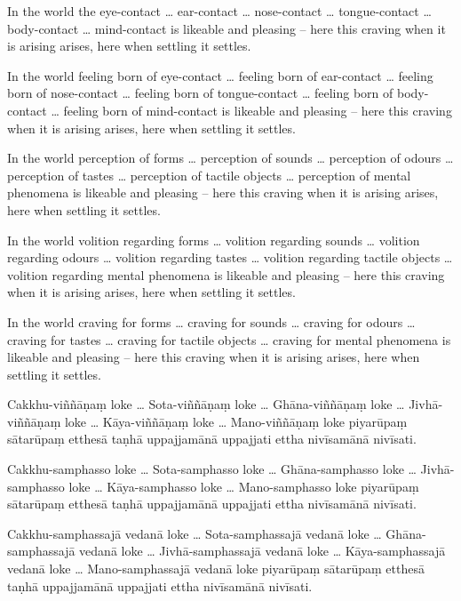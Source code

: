 In the world the eye-contact \ldots{} ear-contact \ldots{} nose-contact \ldots{}
tongue-contact \ldots{} body-contact \ldots{} mind-contact is likeable and
pleasing -- here this craving when it is arising arises, here when settling it
settles.

In the world feeling born of eye-contact \ldots{} feeling born of ear-contact
\ldots{} feeling born of nose-contact \ldots{} feeling born of tongue-contact
\ldots{} feeling born of body-contact \ldots{} feeling born of mind-contact is
likeable and pleasing -- here this craving when it is arising arises, here when
settling it settles.

In the world perception of forms \ldots{} perception of sounds \ldots{}
perception of odours \ldots{} perception of tastes \ldots{} perception of
tactile objects \ldots{} perception of mental phenomena is likeable and pleasing
-- here this craving when it is arising arises, here when settling it settles.

In the world volition regarding forms \ldots{} volition regarding sounds
\ldots{} volition regarding odours \ldots{} volition regarding tastes \ldots{}
volition regarding tactile objects \ldots{} volition regarding mental phenomena
is likeable and pleasing -- here this craving when it is arising arises, here
when settling it settles.

In the world craving for forms \ldots{} craving for sounds \ldots{} craving for
odours \ldots{} craving for tastes \ldots{} craving for tactile objects \ldots{}
craving for mental phenomena is likeable and pleasing -- here this craving when
it is arising arises, here when settling it settles.

\paliPage

Cakkhu-viññāṇaṃ loke \ldots{} Sota-viññāṇaṃ loke \ldots{} Ghāna-viññāṇaṃ loke
\ldots{} Jivhā-viññāṇaṃ loke \ldots{} Kāya-viññāṇaṃ loke \ldots{} Mano-viññāṇaṃ
loke piyarūpaṃ sātarūpaṃ etthesā taṇhā uppajjamānā uppajjati ettha nivīsamānā
nivīsati.

Cakkhu-samphasso loke \ldots{} Sota-samphasso loke \ldots{} Ghāna-samphasso loke
\ldots{} Jivhā-samphasso loke \ldots{} Kāya-samphasso loke \ldots{} Mano-samphasso
loke piyarūpaṃ sātarūpaṃ etthesā taṇhā uppajjamānā uppajjati ettha nivīsamānā
nivīsati.

Cakkhu-samphassajā vedanā loke \ldots{} Sota-samphassajā vedanā loke \ldots{}
Ghāna-samphassajā vedanā loke \ldots{} Jivhā-samphassajā vedanā loke \ldots{}
Kāya-samphassajā vedanā loke \ldots{} Mano-samphassajā vedanā loke piyarūpaṃ
sātarūpaṃ etthesā taṇhā uppajjamānā uppajjati ettha nivīsamānā nivīsati.

